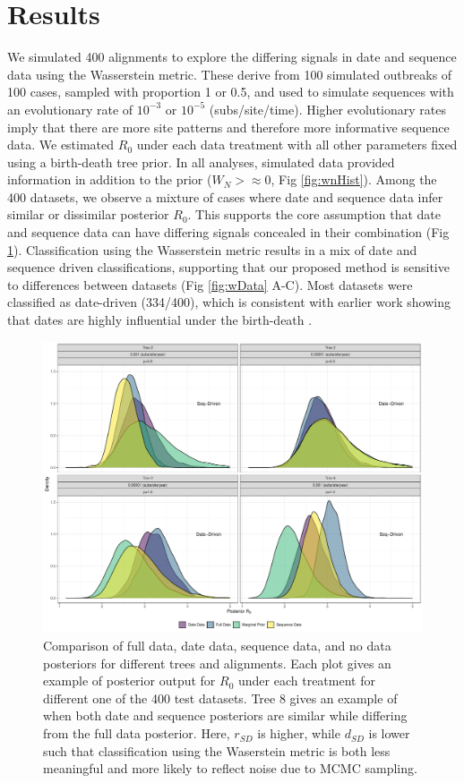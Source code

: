 \documentclass{article}
\begin{document}
\section*{Results}
We simulated 400 alignments to explore the differing signals in date and sequence data using the Wasserstein metric. These derive from 100 simulated outbreaks of 100 cases, sampled with proportion 1 or 0.5, and used to simulate sequences with an evolutionary rate of $10^{-3}$ or $10^{-5}$ (subs/site/time). Higher evolutionary rates imply that there are more site patterns and therefore more informative sequence data. We estimated $R_0$ under each data treatment with all other parameters fixed using a birth-death tree prior. In all analyses, simulated data provided information in addition to the prior ($W_{N}>\approx0$, Fig \ref{fig:wnHist}). Among the 400 datasets, we  observe a mixture of cases where date and sequence data infer similar or dissimilar posterior $R_{0}$. This supports the core assumption that date and sequence data can have differing signals concealed in their combination (Fig \ref{fig:posts}). Classification using the Wasserstein metric results in a mix of date and sequence driven classifications, supporting that our proposed method is sensitive to differences between datasets (Fig \ref{fig:wData} A-C). Most datasets were classified as date-driven (334/400), which is consistent with earlier work showing that dates are highly influential under the birth-death \cite{volz_sampling_2014}. 

\begin{figure}[H]
\centering
\includegraphics[width=1\linewidth]{figures/postEg.pdf}
\caption{Comparison of full data, date data, sequence data, and no data posteriors for different trees and alignments. Each plot gives an example of posterior output for $R_0$ under each treatment for different one of the 400 test datasets. Tree 8 gives an example of when both date and sequence posteriors are similar while differing from the full data posterior. Here, $r_{SD}$ is higher, while $d_{SD}$ is lower such that classification using the Waserstein metric is both less meaningful and more likely to reflect noise due to MCMC sampling.}
\label{fig:posts}
\end{figure}
\end{document}
